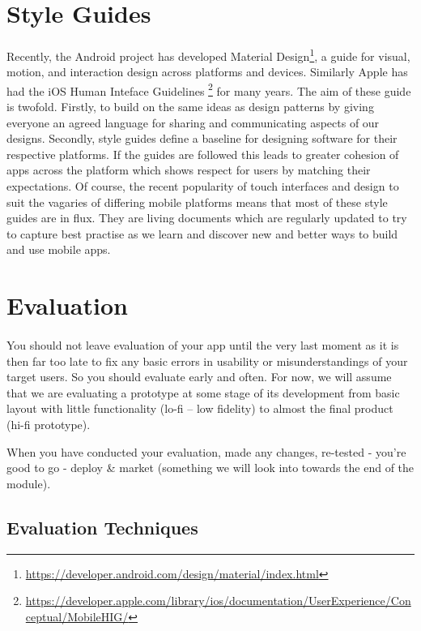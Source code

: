 \section{Style Guides}
\paragraph{} Recently, the Android project has developed Material Design\footnote{\url{https://developer.android.com/design/material/index.html}}, a guide for visual, motion, and interaction design across platforms and devices. Similarly Apple has had the iOS Human Inteface Guidelines \footnote{\url{https://developer.apple.com/library/ios/documentation/UserExperience/Conceptual/MobileHIG/}} for many years. The aim of these guide is twofold. Firstly, to build on the same ideas as design patterns by giving everyone an agreed language for sharing and communicating aspects of our designs. Secondly, style guides define a baseline for designing software for their respective platforms. If the guides are followed this leads to greater cohesion of apps across the platform which shows respect for users by matching their expectations. Of course, the recent popularity of touch interfaces and design to suit the vagaries of differing mobile platforms means that most of these style guides are in flux. They are living documents which are regularly updated to try to capture best practise as we learn and discover new and better ways to build and use mobile apps.


\section{Evaluation}
\paragraph{} You should not leave evaluation of your app until the very last moment as it is then far too late to fix any basic errors in usability or misunderstandings of your target users. So you should evaluate early and often. For now, we will assume that we are evaluating a prototype at some stage of its development from basic layout with little functionality (lo-fi – low fidelity) to almost the final product (hi-fi prototype).

When you have conducted your evaluation, made any changes, re-tested - you’re good to go - deploy \& market (something we will look into towards the end of the module).

\subsection{Evaluation Techniques}

